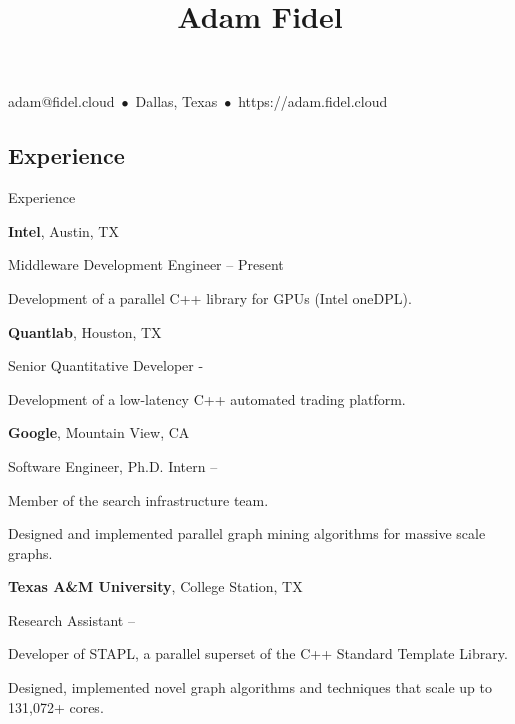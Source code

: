 \documentclass[a4paper,10pt,oneside]{article}
\begin{document}

\title{Adam Fidel}

\begin{subtitle}
\par
adam@fidel.cloud
\,$\bullet$\,
Dallas, Texas
\,$\bullet$\,
https://adam.fidel.cloud
\end{subtitle}


\begin{body}

\section{Experience}
{Experience}


\textbf{Intel},
Austin, TX
\par
Middleware Development Engineer
\hfill
{} --
Present
\begin{detail}
  Development of a parallel C++ library for GPUs (Intel oneDPL).
\par
\end{detail}
\EntryGap

\textbf{Quantlab},
Houston, TX
\par
Senior Quantitative Developer
\hfill
{} -
\begin{detail}
Development of a low-latency C++ automated trading platform.
\par
\end{detail}
\EntryGap


\textbf{Google},
Mountain View, CA
\par
Software Engineer, Ph.D. Intern
\hfill
{} --
\begin{detail}
Member of the search infrastructure team.
\par
 Designed and implemented parallel graph mining algorithms for massive scale graphs.
 \par
\end{detail}
\EntryGap



\textbf{Texas A\&M University}, College Station, TX
\par
Research Assistant
\hfill
{} --
\begin{detail}
Developer of STAPL, a parallel superset of the C++ Standard Template Library.
\par
Designed, implemented novel graph algorithms and techniques that scale up to 131,072+ cores.
\par
\end{detail}
\EntryGap


\end{body}
\end{document}
